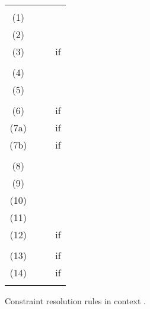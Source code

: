 \documentclass{eptcs}
\begin{document}
\begin{figure}[h]
\begin{center}
\begin{tabular}{|clcl|}
        \hline
                &       &       &                                       \\
        (1)     &                       
                &      
                &                                                 \\
        (2)     &    
                &      
                &                                                 \\
        (3)     &  
                &      
                &  if      \\
                &       &       &                                       \\
        (4)     & 
                &      
                &                            \\
        (5)     &      
                &      
                &                            \\
                &       &       &                                       \\
        (6)    & 
                &      
                & 
                        if \\
        (7a)   & 
                &      
                & 
                        if \\ 
        (7b)   & 
                &      
                & 
                        if \\ 
                &       &       &                                       \\   
        (8)     &    
                &      
                &                      \\
        (9)     & 
                &      
                &              \\
        (10)     & 
                &      
                &              \\
        (11)     & 
                &      
                &              \\
        (12)    & 
                &      
                & 
                        if       \\
                &       &       &                                       \\
   
        (13)    &   
                &      
                &  if                    \\
        (14)    &  
                &      
                &  if                    \\
                &       &       &                                       \\
        \hline
\end{tabular}
\end{center}
\caption{Constraint resolution rules in context .}
\label{fig:constraint_rules}
\end{figure}
\end{document}
